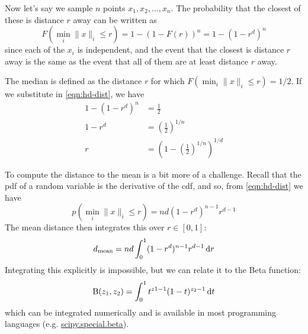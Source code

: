 Now let's say we sample $n$ points $x_1, x_2, \ldots, x_n$. The probability that the closest of these is distance $r$ away can be written as
\begin{equation}
F(\min_i \|x\|_i \leq r) = 1 - \left(1 - F(r)\right)^n = 1 - (1 - r^d)^n
\label{eqn:hd-dist}
\end{equation}
since each of the $x_i$ is independent, and the event that the closest is distance $r$ away is the same as the event that all of them are at least distance $r$ away.

The median is defined as the distance $r$ for which $F(\min_i \|x\|_i \leq r) = 1 / 2$. If we substitute in \eqref{eqn:hd-dist}, we have
\begin{align*}
  1 - (1 - r^d)^n &= \frac{1}{2}\\
  1 - r^d &= \left(\frac{1}{2}\right)^{1 / n}\\
  r &= \left(1 - \left(\frac{1}{2}\right)^{1 / n}\right)^{1 / d}
\end{align*}

To compute the distance to the mean is a bit more of a challenge. Recall that the pdf of a random variable is the derivative of the cdf, and so, from \eqref{eqn:hd-dist} we have
$$
p(\min_i \|x\|_i \leq r) = nd(1 - r^d)^{n-1} r^{d - 1}
$$
The mean distance then integrates this over $r\in [0, 1]$:
$$
d_{\mathrm{mean}} = nd \int_0^1 (1 - r^d)^{n-1} r^{d - 1} \operatorname{d}\!{r}
$$
Integrating this explicitly is impossible, but we can relate it to the Beta function:
$$
\mathrm{B}(z_1, z_2) = \int_0^1 t^{z1 - 1} (1 - t)^{z_2 - 1}\operatorname{d}\!{t}
$$
which can be integrated numerically and is available in most programming languages (e.g. \href{https://docs.scipy.org/doc/scipy/reference/generated/scipy.special.beta.html}{scipy.special.beta}).
